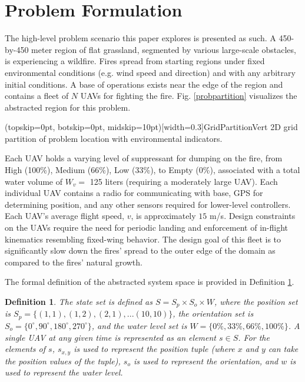 \documentclass{ieeeaccess}
\newtheorem{definition}{Definition}
\begin{document}
\section{Problem Formulation}
The high-level problem scenario this paper explores is presented as such. A 450-by-450 meter region of flat grassland, segmented by various large-scale obstacles, is experiencing a wildfire. Fires spread from starting regions under fixed environmental conditions (e.g. wind speed and direction) and with any arbitrary initial conditions. A base of operations exists near the edge of the region and contains a fleet of $N$ UAVs for fighting the fire. Fig. \ref{probpartition} visualizes the abstracted region for this problem. 

\Figure[t!](topskip=0pt, botskip=0pt, midskip=10pt)[width=0.3\textwidth]{GridPartitionVert}
{2D grid partition of problem location with environmental indicators.\label{probpartition}}

Each UAV holds a varying level of suppressant for dumping on the fire, from High (100\%), Medium (66\%), Low (33\%), to Empty (0\%), associated with a total water volume of $W_v = $ 125 liters (requiring a moderately large UAV). Each individual UAV contains a radio for communicating with base, GPS for determining position, and any other sensors required for lower-level controllers. Each UAV's average flight speed, $v$, is approximately $15$ m/s. Design constraints on the UAVs require the need for periodic landing and enforcement of in-flight kinematics resembling fixed-wing behavior. The design goal of this fleet is to significantly slow down the fires' spread to the outer edge of the domain as compared to the fires' natural growth.

The formal definition of the abstracted system space is provided in Definition \ref{system}.

\begin{definition}
	\label{system}
	The state set is defined as $S = S_p \times S_o \times W$, where the position set is $S_p = \{(1, 1), (1, 2), (2, 1),... (10, 10)\}$, the orientation set is $S_o = \{0^\circ, 90^\circ, 180^\circ, 270^\circ\}$, and the water level set is $W= \{0\%,33\%, 66\%, 100\%\}$. A single UAV at any given time is represented as an element $s \in S$. For the elements of $s$, $s_{x,y}$ is used to represent the position tuple (where $x$ and $y$ can take the position values of the tuple), $s_o$ is used to represent the orientation, and $w$ is used to represent the water level.
\end{definition}
\end{document}
